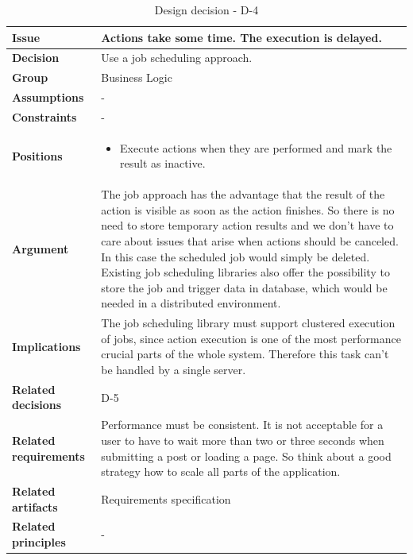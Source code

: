 \documentclass[11pt]{article}
\begin{document}
\begin{table}[h] \small
	\begin{tabularx}{\textwidth}{ | l | X |}
    	\hline
	\cellcolor[gray]{0.9}
    	\textbf{Issue} &  Actions take some time. The execution is delayed.\\
	\hline
	\cellcolor[gray]{0.9}
	\textbf{Decision} & Use a job scheduling approach. \\
	\hline
	\cellcolor[gray]{0.9}
	\textbf{Group} & Business Logic \\
	\hline
	\cellcolor[gray]{0.9}
	\textbf{Assumptions} & - \\
	\hline
	\cellcolor[gray]{0.9}
	\textbf{Constraints} & - \\
	\hline
	\cellcolor[gray]{0.9}
	\textbf{Positions} &
		\begin{itemize}
		\item Execute actions when they are performed and mark the result as inactive.
		\end{itemize}\\
	\hline
	\cellcolor[gray]{0.9}
	\textbf{Argument} & The job approach has the advantage that the result of the action is visible as soon as the action finishes. So there is no need to store temporary action results and we don't have to care about issues that arise when actions should be canceled. In this case the scheduled job would simply be deleted. Existing job scheduling libraries also offer the possibility to store the job and trigger data in database, which would be needed in a distributed environment.  \\
	\hline
	\cellcolor[gray]{0.9}
	\textbf{Implications} & The job scheduling library must support clustered execution of jobs, since action execution is one of the most performance crucial parts of the whole system. Therefore this task can't be handled by a single server.\\
	\hline
	\cellcolor[gray]{0.9}
	\textbf{Related decisions} & D-5 \\
	\hline
	\cellcolor[gray]{0.9}
	\textbf{Related requirements} & Performance must be consistent. It is not acceptable for a user to have to wait more than two or three seconds when submitting a post or loading a page. So think about a good strategy how to scale all parts of the application.\\
	\hline
	\cellcolor[gray]{0.9}
	\textbf{Related artifacts} & Requirements specification\\
	\hline
	\cellcolor[gray]{0.9}
	\textbf{Related principles} & -\\
	\hline
	\end{tabularx}
	\caption{Design decision - D-4}
	\label{dec:D4}
\end{table}
\end{document}
